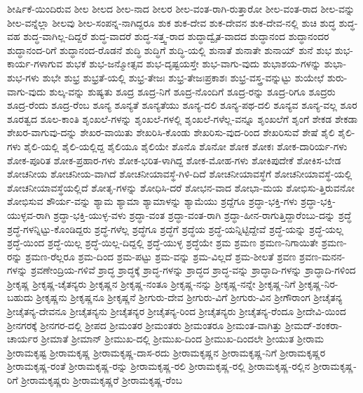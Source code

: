 {ಶೀರ್ಷಿಕೆ-ಯಿಂದಿರುವ
ಶೀಲ
ಶೀಲದ
ಶೀಲ-ನಾದ
ಶೀಲರ
ಶೀಲ-ವಂತ-ರಾಗಿ-ರುತ್ತಾರೋ
ಶೀಲ-ವಂತ-ರಾದ
ಶೀಲ-ವನ್ನು
ಶೀಲ-ವನ್ನೆಲ್ಲಾ
ಶೀಲವು
ಶೀಲ-ಸಂಪನ್ನ-ನಾಗಿದ್ದರೂ
ಶುಕ
ಶುಕ-ದೇವ
ಶುಕ-ದೇವನ
ಶುಕ-ದೇವ-ನಲ್ಲಿ
ಶುಚಿ
ಶುದ್ಧ
ಶುದ್ಧ-ವಹ
ಶುದ್ಧ-ವಾಗಿಲ್ಲ-ದಿದ್ದರೆ
ಶುದ್ಧ-ವಾದರೆ
ಶುದ್ಧ-ಸತ್ತ್ವ-ರಾದ
ಶುದ್ಧಾದ್ವೈತ-ವಾದದ
ಶುದ್ಧಾನಂದ
ಶುದ್ಧಾನಂದರ
ಶುದ್ಧಾನಂದ-ರಿಗೆ
ಶುದ್ಧಾನಂದ-ರೊಡನೆ
ಶುದ್ಧಿ
ಶುದ್ಧಿಗೆ
ಶುದ್ಧಿ-ಯಲ್ಲಿ
ಶುನಾತೆ
ಶುನಾತೇ
ಶುನಾಯ್
ಶುನೆ
ಶುಭ
ಶುಭ-ಕಾರ್ಯ-ಗಳಾಗುವ
ಶುಭಕೆ
ಶುಭ-ಜನ್ಮೋತ್ಸವ
ಶುಭ-ದೃಷ್ಟಯಸ್ತೇ
ಶುಭ-ವಾಗು-ವುದು
ಶುಭಾಶಯ-ಗಳನ್ನು
ಶುಭಾ-ಶುಭ-ಗಳು
ಶುಭೇ
ಶುಭ್ರ
ಶುಭ್ರತೆ-ಯಲ್ಲಿ
ಶುಭ್ರ-ತೇಜಃ
ಶುಭ್ರ-ತೇಜಃಪ್ರಕಾಶಃ
ಶುಭ್ರ-ವಸ್ತ್ರ-ವನ್ನುಟ್ಟು
ಶುಯೇಛೆ
ಶುರು-ವಾಗು-ವುದು
ಶುಲ್ಕ-ವನ್ನು
ಶುಷ್ಯತು
ಶೂದ್ರ
ಶೂದ್ರ-ನಿಗೆ
ಶೂದ್ರ-ನೊಂದಿಗೆ
ಶೂದ್ರ-ರನ್ನು
ಶೂದ್ರ-ರಿಗೂ
ಶೂದ್ರರು
ಶೂದ್ರ-ರೆಂದು
ಶೂದ್ರ-ರೆಂಬ
ಶೂನ್ಯ
ಶೂನ್ಯತೆ
ಶೂನ್ಯತೆಯು
ಶೂನ್ಯ-ದಲಿ
ಶೂನ್ಯ-ಪಥ-ದಲಿ
ಶೂನ್ಯವ
ಶೂನ್ಯ-ವಲ್ಲ
ಶೂರ
ಶೂರತ್ವದ
ಶೂಲ-ಕಾಂತಿ
ಶೃಂಖಲೆ-ಗಳನ್ನು
ಶೃಂಖಲೆ-ಗಳಲ್ಲಿ
ಶೃಂಖಲೆ-ಗಳೆಲ್ಲ-ವನ್ನೂ
ಶೃಂಖಲೆಗೆ
ಶೃಂಗೆ
ಶೇಕಡ
ಶೇಕಡಾ
ಶೇಖರ-ವಾಗುವು-ದನ್ನು
ಶೇಖರ-ವಾಯಿತು
ಶೇಖರಿಸಿ-ಕೊಂಡು
ಶೇಖರಿಸು-ವುದ-ರಿಂದ
ಶೇಖರಿಸುವೆ
ಶೇಷೆ
ಶೈಲಿ
ಶೈಲಿ-ಗಳು
ಶೈಲಿ-ಯಲ್ಲಿ
ಶೈಲಿ-ಯಲ್ಲಿದ್ದ
ಶೈಲಿಯೂ
ಶೈಲಿಯೇ
ಶೊನೊ
ಶೊನೋ
ಶೋಕ
ಶೋಕಃ
ಶೋಕ-ದಾರಿರ್ಯ-ಗಳು
ಶೋಕ-ಪೂರಿತ
ಶೋಕ-ಪ್ರಹಾರ-ಗಳು
ಶೋಕ-ಭರಿತ-ಳಾಗಿದ್ದ
ಶೋಕ-ಮೋಹ-ಗಳು
ಶೋಕಿಪುದೇಕೆ
ಶೋಕಿಸ-ಬೇಡ
ಶೋಚನೀಯ
ಶೋಚನೀಯ-ವಾಗಿದೆ
ಶೋಚನೀಯಾವಸ್ಥೆ-ಗಿಳಿ-ದಿದೆ
ಶೋಚನೀಯಾವಸ್ಥೆಗೆ
ಶೋಚನೀಯಾವಸ್ಥೆ-ಯಲ್ಲಿ
ಶೋಚನೀಯಾವಸ್ಥೆಯಲ್ಲಿದೆ
ಶೋತೃ-ಗಳನ್ನು
ಶೋಧಿಸಿ-ದರೆ
ಶೋಭನ-ವಾದ
ಶೋಭಾ-ಮಯ
ಶೋಭಿಸು-ತ್ತಿರುವನೋ
ಶೋಭಿಸುವ
ಶೌರ್ಯ-ವನ್ನು
ಶ್ಯಾಮ
ಶ್ಯಾಮಾ
ಶ್ಯಾಮಾಳನ್ನು
ಶ್ಯಾಮೆಯು
ಶ್ರದ್ದೆಗೂ
ಶ್ರದ್ಧಾ-ಭಕ್ತಿ-ಗಳು
ಶ್ರದ್ಧಾ-ಭಕ್ತಿ-ಯುಳ್ಳವ-ರಾಗಿ
ಶ್ರದ್ಧಾ-ಭಕ್ತಿ-ಯುಳ್ಳ-ವಳು
ಶ್ರದ್ಧಾ-ವಂತ
ಶ್ರದ್ಧಾ-ವಂತ-ರಾಗಿ
ಶ್ರದ್ಧಾ-ಹೀನ-ರಾಗುತ್ತಿದ್ದಾರೆಂಬು-ದನ್ನು
ಶ್ರದ್ಧೆ
ಶ್ರದ್ಧೆ-ಗಳನ್ನಿಟ್ಟು-ಕೊಂಡಿದ್ದರು
ಶ್ರದ್ಧೆ-ಗಳೆಲ್ಲ
ಶ್ರದ್ಧೆಗೂ
ಶ್ರದ್ಧೆಗೆ
ಶ್ರದ್ಧೆಯ
ಶ್ರದ್ಧೆ-ಯನ್ನಿಟ್ಟಿದ್ದೇವೆ
ಶ್ರದ್ಧೆ-ಯನ್ನು
ಶ್ರದ್ಧೆ-ಯಲ್ಲ
ಶ್ರದ್ಧೆ-ಯಿಂದ
ಶ್ರದ್ಧೆ-ಯಿಲ್ಲ
ಶ್ರದ್ಧೆ-ಯಿಲ್ಲ-ದಿದ್ದಲ್ಲಿ
ಶ್ರದ್ಧೆ-ಯುಳ್ಳ
ಶ್ರದ್ಧೆಯೇ
ಶ್ರಮ
ಶ್ರಮಣ
ಶ್ರಮಣ-ನಿಗಾಯಿತೇ
ಶ್ರಮಣ-ರನ್ನು
ಶ್ರಮಣ-ರೆಲ್ಲರೂ
ಶ್ರಮ-ದಿಂದ
ಶ್ರಮ-ಪಟ್ಟು
ಶ್ರಮ-ವನ್ನು
ಶ್ರಮ-ವಿಲ್ಲದೆ
ಶ್ರಮ-ಶೀಲತೆ
ಶ್ರವಣ
ಶ್ರವಣ-ಮನನ-ಗಳನ್ನು
ಶ್ರವಣೇಂದ್ರಿಯ-ಗಳಿವೆ
ಶ್ರಾದ್ಧ
ಶ್ರಾದ್ಧಕ್ಕೆ
ಶ್ರಾದ್ಧ-ಗಳನ್ನು
ಶ್ರಾದ್ಧದ
ಶ್ರಾದ್ಧ-ವನ್ನು
ಶ್ರಾದ್ಧಾದಿ-ಗಳನ್ನು
ಶ್ರಾದ್ಧಾದಿ-ಗಳಿಂದ
ಶ್ರೀಕೃಷ್ಣ
ಶ್ರೀಕೃಷ್ಣ-ಚೈತನ್ಯರು
ಶ್ರೀಕೃಷ್ಣನ
ಶ್ರೀಕೃಷ್ಣ-ನಂತೂ
ಶ್ರೀಕೃಷ್ಣ-ನನ್ನು
ಶ್ರೀಕೃಷ್ಣ-ನನ್ನೇ
ಶ್ರೀಕೃಷ್ಣ-ನಿಗೆ
ಶ್ರೀಕೃಷ್ಣ-ನಿರ-ಬಹುದು
ಶ್ರೀಕೃಷ್ಣನು
ಶ್ರೀಕೃಷ್ಣನೂ
ಶ್ರೀಕೃಷ್ಣನೆ
ಶ್ರೀಗುರು-ದೇವ
ಶ್ರೀಗುರು-ವಿಗೆ
ಶ್ರೀಗುರು-ವಿನ
ಶ್ರೀಗೌರಾಂಗ
ಶ್ರೀಚೈತನ್ಯ
ಶ್ರೀಚೈತನ್ಯ-ದೇವನೂ
ಶ್ರೀಚೈತನ್ಯನು
ಶ್ರೀಚೈತನ್ಯರ
ಶ್ರೀಚೈತನ್ಯ-ರಿಂದ
ಶ್ರೀಚೈತನ್ಯರು
ಶ್ರೀಚೈತನ್ಯ-ರೆಂದೂ
ಶ್ರೀದೇವಿ-ಯಿಂದ
ಶ್ರೀನಗರಕ್ಕೆ
ಶ್ರೀನಗರ-ದಲ್ಲಿ
ಶ್ರೀಪದ
ಶ್ರೀಮಂತರ
ಶ್ರೀಮಂತರು
ಶ್ರೀಮಂತರೂ
ಶ್ರೀಮಂತ-ವಾಗಿತ್ತು
ಶ್ರೀಮದ್-ಶಂಕರಾ-ಚಾರ್ಯರ
ಶ್ರೀಮಾತೆ
ಶ್ರೀಮಾನ್
ಶ್ರೀಮುಖ-ದಲ್ಲಿ
ಶ್ರೀಮುಖ-ದಿಂದ
ಶ್ರೀಮುಖ-ದಿಂದಲೇ
ಶ್ರೀಯುತ
ಶ್ರೀರಾಮ
ಶ್ರೀರಾಮಕೃಷ್ಟ
ಶ್ರೀರಾಮಕೃಷ್ಣ
ಶ್ರೀರಾಮಕೃಷ್ಣ-ದಾಸ-ರದು
ಶ್ರೀರಾಮಕೃಷ್ಣನ
ಶ್ರೀರಾಮಕೃಷ್ಣ-ನಿಗೆ
ಶ್ರೀರಾಮಕೃಷ್ಣರ
ಶ್ರೀರಾಮಕೃಷ್ಣ-ರಂತೆ
ಶ್ರೀರಾಮಕೃಷ್ಣ-ರನ್ನು
ಶ್ರೀರಾಮಕೃಷ್ಣ-ರಲಿ
ಶ್ರೀರಾಮಕೃಷ್ಣ-ರಲ್ಲಿ
ಶ್ರೀರಾಮಕೃಷ್ಣ-ರಲ್ಲಿನ
ಶ್ರೀರಾಮಕೃಷ್ಣ-ರಿಗೆ
ಶ್ರೀರಾಮಕೃಷ್ಣರು
ಶ್ರೀರಾಮಕೃಷ್ಣರೆ
ಶ್ರೀರಾಮಕೃಷ್ಣ-ರೆಂಬ
}
